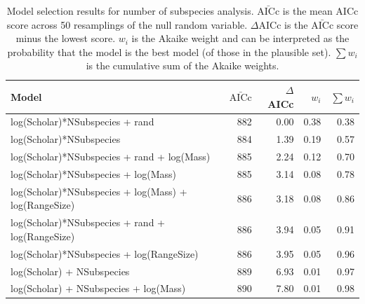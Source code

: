 \begin{table}[t]
\begin{tabular}{>{\small}lrrrr}

\normalsize{Model} & $\bar{\text{AICc}}$ & $\Delta$AICc & $w_i$ & $\sum w_i$\\
\hline
log(Scholar)*NSubspecies + rand & 
882 & 0.00 &
0.38 & 0.38\\
log(Scholar)*NSubspecies & 
884 & 1.39 &
0.19 & 0.57\\
log(Scholar)*NSubspecies + rand + log(Mass) & 
885 & 2.24 &
0.12 & 0.70\\
log(Scholar)*NSubspecies  + log(Mass) & 
885 & 3.14 &
0.08 & 0.78\\
log(Scholar)*NSubspecies  + log(Mass) + log(RangeSize) & 
886 & 3.18 &
0.08 & 0.86\\
log(Scholar)*NSubspecies  + rand + log(RangeSize) & 
886 & 3.94 &
0.05 & 0.91\\
log(Scholar)*NSubspecies  + log(RangeSize) & 
886 & 3.95 &
0.05 & 0.96\\
log(Scholar) + NSubspecies & 
889 & 6.93 &
0.01 & 0.97\\
log(Scholar) + NSubspecies + log(Mass) & 
890 & 7.80 &
0.01 & 0.98
\end{tabular}
\caption[Model selection results for number of subspecies analysis]{
Model selection results for number of subspecies analysis. 
$\bar{\text{AICc}}$ is the mean AICc score across 50 resamplings of the null random variable. 
$\Delta$AICc is the $\bar{\text{AICc}}$ score minus the lowest score. 
$w_i$ is the Akaike weight and can be interpreted as the probability that the model is the best model (of those in the plausible set).
$\sum w_i$ is the cumulative sum of the Akaike weights.}
\label{t:subsmodels}
\end{table}



